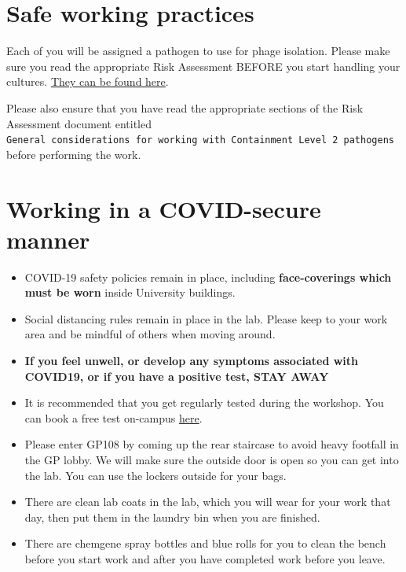 \documentclass[
]{book}
\providecommand{\tightlist}{%
  \setlength{\itemsep}{0pt}\setlength{\parskip}{0pt}}
\begin{document}
\hypertarget{safe-working-practices}{%
\section*{Safe working practices}\label{safe-working-practices}}

Each of you will be assigned a pathogen to use for phage isolation. Please make sure you read the appropriate Risk Assessment BEFORE you start handling your cultures. \protect\hyperlink{risk-assessment}{They can be found here}.

Please also ensure that you have read the appropriate sections of the Risk Assessment document entitled \texttt{General\ considerations\ for\ working\ with\ Containment\ Level\ 2\ pathogens} before performing the work.

\hypertarget{working-in-a-covid-secure-manner}{%
\section*{Working in a COVID-secure manner}\label{working-in-a-covid-secure-manner}}

\begin{itemize}
\tightlist
\item
  COVID-19 safety policies remain in place, including \textbf{face-coverings which must be worn} inside University buildings.
\item
  Social distancing rules remain in place in the lab. Please keep to your work area and be mindful of others when moving around.
\item
  \textbf{If you feel unwell, or develop any symptoms associated with COVID19, or if you have a positive test, STAY AWAY}
\item
  It is recommended that you get regularly tested during the workshop. You can book a free test on-campus \href{https://www.exeter.ac.uk/coronavirus/times/}{here}.
\item
  Please enter GP108 by coming up the rear staircase to avoid heavy footfall in the GP lobby. We will make sure the outside door is open so you can get into the lab. You can use the lockers outside for your bags.
\item
  There are clean lab coats in the lab, which you will wear for your work that day, then put them in the laundry bin when you are finished.
\item
  There are chemgene spray bottles and blue rolls for you to clean the bench before you start work and after you have completed work before you leave.
\end{itemize}
\end{document}
